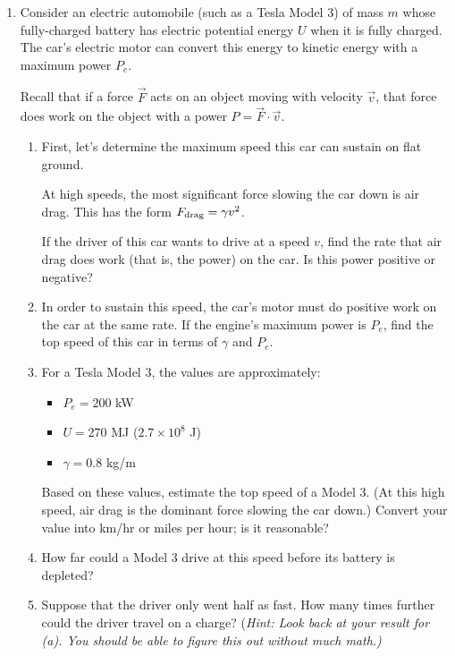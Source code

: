 \documentclass[12pt]{article}
\begin{document}
\Large
\centerline{}
\normalsize
\begin{enumerate}
	
\item Consider an electric automobile (such as a Tesla Model 3) of mass $m$ whose fully-charged battery has electric potential energy $U$ when it is fully charged. The car's electric motor can convert this energy to kinetic energy with a maximum power $P_e$.

Recall that if a force $\vec F$ acts on an object moving with velocity $\vec v$, that force does work on the object with a power $P = \vec F \cdot \vec v$.

\begin{enumerate}
	\item First, let's determine the maximum speed this car can sustain on flat ground.
	
	At high speeds, the most significant force slowing the car down is air drag. This has the form $F_{\rm drag} = \gamma v^2$.
	
		If the driver of this car wants to drive at a speed $v$, find the rate that air drag does work (that is, the power) on the car. Is this power positive or negative?
	
	\item In order to sustain this speed, the car's motor must do positive work on the car at the same rate. If the engine's maximum power is $P_e$, find the top speed of this car in terms of $\gamma$ and $P_e$.
	
	\item For a Tesla Model 3, the values are approximately:
	
	\begin{itemize}
	\item $P_e = 200$ kW
	\item $U = 270$ MJ ($2.7 \times 10^8$ J)
	\item $\gamma = 0.8$ kg/m
	\end{itemize}
	
	Based on these values, estimate the top speed of a Model 3. (At this high speed, air drag is the dominant force slowing the car down.) Convert your value into km/hr or miles per hour; is it reasonable?
	
	\item How far could a Model 3 drive at this speed before its battery is depleted?
	
	\item Suppose that the driver only went half as fast. How many times further could the driver travel on a charge? (\it Hint: Look back at your result for (a). You should be able to figure this out without much math.)\rm
	

\end{enumerate}
\end{enumerate}
\end{document}
